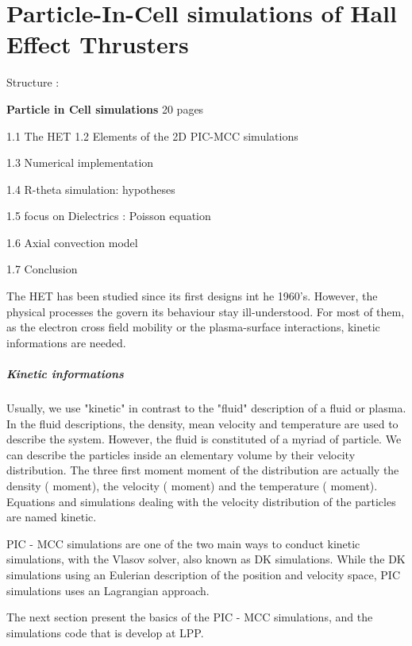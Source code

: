 



\chapter{Particle-In-Cell simulations of Hall Effect Thrusters}
\label{ch-1}
Structure :

{\bf Particle in Cell simulations} 20 pages
\begin{zzz}
  
  1.1 The HET
  1.2 Elements of the 2D PIC-MCC simulations

  1.3 Numerical implementation

  1.4 R-theta simulation: hypotheses
  
  1.5 focus on  Dielectrics : Poisson equation 

  1.6 Axial convection model
  
  1.7 Conclusion
\end{zzz}

The \ac{HET} has been studied since its first designs int he 1960's.
However, the physical processes the govern its behaviour stay ill-understood.
For most of them, as the electron cross field mobility or the plasma-surface interactions, kinetic informations are needed.

\paragraph{Kinetic informations}
Usually, we use "kinetic" in contrast to the "fluid" description of a fluid or plasma.
In the fluid descriptions, the density, mean velocity and temperature are used to describe the system.
However, the fluid is constituted of a myriad of particle.
We can describe the particles inside an elementary volume by their velocity distribution.
The three first moment moment of the distribution are actually the density ( moment), the velocity ( moment) and the temperature ( moment).
Equations and simulations dealing with the velocity distribution of the particles are named kinetic.

\ac{PIC} - \ac{MCC} simulations are one of the two main ways to conduct kinetic simulations, with the Vlasov solver, also known as \ac{DK} simulations.
While the \ac{DK} simulations using an Eulerian description of the position and velocity space, \ac{PIC} simulations uses an Lagrangian approach.

The next section present the basics of the \ac{PIC} - \ac{MCC} simulations, and the simulations code \LPPic that is develop at \ac{LPP}.


 
% 
% 
% 
% 
% 
% 
